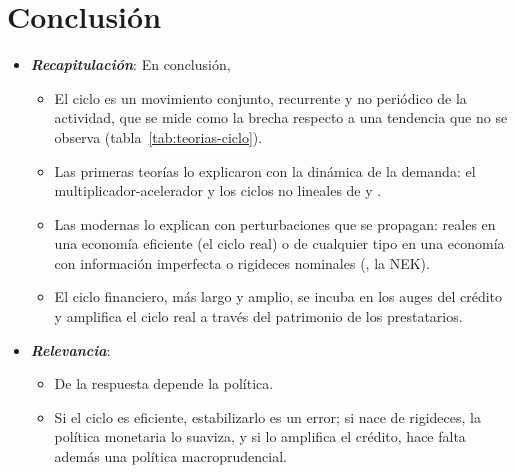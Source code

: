 \documentclass[11pt]{article}
\begin{document}
\section*{Conclusión}

\begin{itemize}
\item \textbf{\emph{Recapitulación}}: En conclusión,
  \begin{itemize}
  \item El ciclo es un movimiento conjunto, recurrente y no periódico de la actividad, que se mide como la brecha respecto a una tendencia que no se observa (tabla~\ref{tab:teorias-ciclo}).
  \item Las primeras teorías lo explicaron con la dinámica de la demanda: el multiplicador-acelerador y los ciclos no lineales de  y .
  \item Las modernas lo explican con perturbaciones que se propagan: reales en una economía eficiente (el ciclo real) o de cualquier tipo en una economía con información imperfecta o rigideces nominales (, la NEK).
  \item El ciclo financiero, más largo y amplio, se incuba en los auges del crédito y amplifica el ciclo real a través del patrimonio de los prestatarios.
  \end{itemize}
\item \textbf{\emph{Relevancia}}:
  \begin{itemize}
  \item De la respuesta depende la política.

  \item Si el ciclo es eficiente, estabilizarlo es un error; si nace de rigideces, la política monetaria lo suaviza, y si lo amplifica el crédito, hace falta además una política macroprudencial.


\end{itemize}
\end{itemize}
\end{document}
